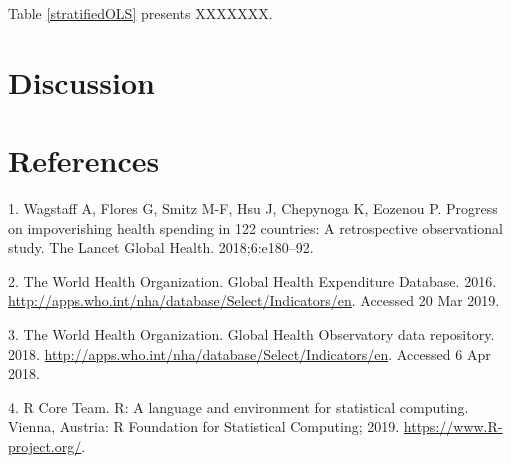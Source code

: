 \documentclass[]{elsarticle} %
\begin{document}
Table \ref{stratifiedOLS} presents XXXXXXX.

\hypertarget{discussion}{%
\section{Discussion}\label{discussion}}

\hypertarget{references}{%
\section*{References}\label{references}}

\hypertarget{refs}{}
\leavevmode\hypertarget{ref-wagstaff2018progress}{}%
1. Wagstaff A, Flores G, Smitz M-F, Hsu J, Chepynoga K, Eozenou P. Progress on impoverishing health spending in 122 countries: A retrospective observational study. The Lancet Global Health. 2018;6:e180--92.

\leavevmode\hypertarget{ref-WHOdata}{}%
2. The World Health Organization. Global Health Expenditure Database. 2016. \url{http://apps.who.int/nha/database/Select/Indicators/en}. Accessed 20 Mar 2019.

\leavevmode\hypertarget{ref-WHOlife}{}%
3. The World Health Organization. Global Health Observatory data repository. 2018. \url{http://apps.who.int/nha/database/Select/Indicators/en}. Accessed 6 Apr 2018.

\leavevmode\hypertarget{ref-R353}{}%
4. R Core Team. R: A language and environment for statistical computing. Vienna, Austria: R Foundation for Statistical Computing; 2019. \url{https://www.R-project.org/}.
\end{document}
